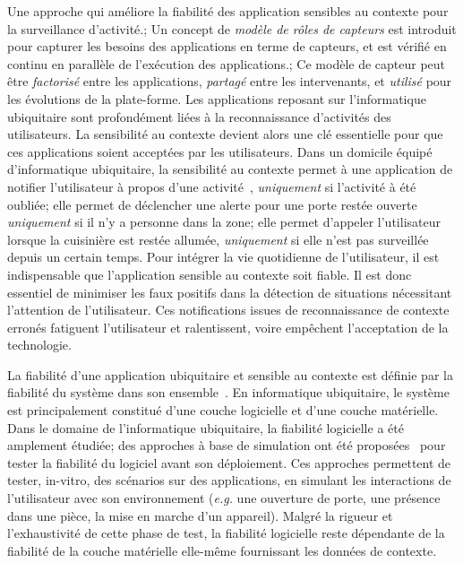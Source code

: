 {
  Une approche qui améliore la fiabilité des application sensibles au contexte pour la surveillance d'activité.;
  Un concept de {\em modèle de rôles de capteurs} est introduit pour capturer les besoins des applications en terme de capteurs, et est vérifié en continu en parallèle de l'exécution des applications.;
  Ce modèle de capteur peut être {\em factorisé} entre les applications, {\em partagé} entre les intervenants, et {\em utilisé} pour les évolutions de la plate-forme.
}
Les applications reposant sur l'informatique ubiquitaire sont profondément liées à la reconnaissance d'activités des utilisateurs. 
La sensibilité au contexte devient alors une clé essentielle pour que ces applications soient acceptées par les utilisateurs.
Dans un domicile équipé d'informatique ubiquitaire, la sensibilité au contexte permet à une application de notifier l'utilisateur à propos d'une activité~\cite{CHAN-REVIEW-COMPUTER2008}, {\em uniquement} si l'activité à été oubliée; elle permet de déclencher une alerte pour une porte restée ouverte {\em uniquement} si il n'y a personne dans la zone; elle permet d'appeler l'utilisateur lorsque la cuisinière est restée allumée, {\em uniquement} si elle n'est pas surveillée depuis un certain temps.
Pour intégrer la vie quotidienne de l'utilisateur, il est indispensable que l'application sensible au contexte soit fiable. 
Il est donc essentiel de minimiser les faux positifs dans la détection de situations nécessitant l'attention de l'utilisateur. Ces notifications issues de reconnaissance de contexte erronés fatiguent l'utilisateur et ralentissent, voire empêchent l'acceptation de la technologie.

La fiabilité d'une application ubiquitaire et sensible au contexte est définie par la fiabilité du système dans son ensemble~\cite{STANKOVIC-OPPORTUNITIES-COMPUTER2005,MENNICKEN-FROM-UBICOMP2014}. En informatique ubiquitaire, le système est principalement constitué d'une couche logicielle et d'une couche matérielle. 
Dans le domaine de l'informatique ubiquitaire, la fiabilité logicielle a été amplement étudiée; des approches à base de simulation ont été proposées~\cite{BRUNO-DIASIM-MOBIQUITOUS2009} pour tester la fiabilité du logiciel avant son déploiement. Ces approches permettent de tester, in-vitro, des scénarios sur des applications, en simulant les interactions de l'utilisateur avec son environnement ({\em e.g.} une ouverture de porte, une présence dans une pièce, la mise en marche d'un appareil). Malgré la rigueur et l'exhaustivité de cette phase de test, la fiabilité logicielle reste dépendante de la fiabilité de la couche matérielle elle-même fournissant les données de contexte.

